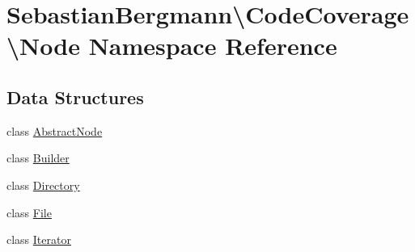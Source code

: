 \hypertarget{namespace_sebastian_bergmann_1_1_code_coverage_1_1_node}{}\section{Sebastian\+Bergmann\textbackslash{}Code\+Coverage\textbackslash{}Node Namespace Reference}
\label{namespace_sebastian_bergmann_1_1_code_coverage_1_1_node}
\subsection*{Data Structures}
\begin{DoxyCompactItemize}
\item 
class \mbox{\hyperlink{class_sebastian_bergmann_1_1_code_coverage_1_1_node_1_1_abstract_node}{Abstract\+Node}}
\item 
class \mbox{\hyperlink{class_sebastian_bergmann_1_1_code_coverage_1_1_node_1_1_builder}{Builder}}
\item 
class \mbox{\hyperlink{class_sebastian_bergmann_1_1_code_coverage_1_1_node_1_1_directory}{Directory}}
\item 
class \mbox{\hyperlink{class_sebastian_bergmann_1_1_code_coverage_1_1_node_1_1_file}{File}}
\item 
class \mbox{\hyperlink{class_sebastian_bergmann_1_1_code_coverage_1_1_node_1_1_iterator}{Iterator}}
\end{DoxyCompactItemize}
